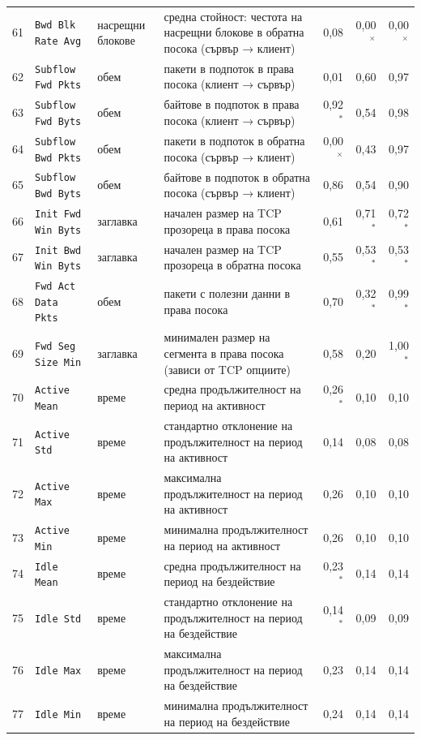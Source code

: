 {{\begin{tabularx}{\textwidth}{@{}rl l Lrrr@{}}
61 & \texttt{Bwd Blk Rate Avg} & насрещни блокове & средна стойност: честота на насрещни блокове в обратна посока (сървър → клиент) & 0,08 & 0,00$^{\times}$ & 0,00$^{\times}$\\
62 & \texttt{Subflow Fwd Pkts} & обем & пакети в подпоток в права посока (клиент → сървър) & 0,01 & 0,60 & 0,97\\
63 & \texttt{Subflow Fwd Byts} & обем & байтове в подпоток в права посока (клиент → сървър) & 0,92$^{\ast}$ & 0,54 & 0,98\\
64 & \texttt{Subflow Bwd Pkts} & обем & пакети в подпоток в обратна посока (сървър → клиент) & 0,00$^{\times}$ & 0,43 & 0,97\\
65 & \texttt{Subflow Bwd Byts} & обем & байтове в подпоток в обратна посока (сървър → клиент) & 0,86 & 0,54 & 0,90\\
66 & \texttt{Init Fwd Win Byts} & заглавка & начален размер на TCP прозореца в права посока & 0,61 & 0,71$^{\ast}$ & 0,72$^{\ast}$\\
67 & \texttt{Init Bwd Win Byts} & заглавка & начален размер на TCP прозореца в обратна посока & 0,55 & 0,53$^{\ast}$ & 0,53$^{\ast}$\\
68 & \texttt{Fwd Act Data Pkts} & обем & пакети с полезни данни в права посока & 0,70 & 0,32$^{\ast}$ & 0,99$^{\ast}$\\
69 & \texttt{Fwd Seg Size Min} & заглавка & минимален размер на сегмента в права посока (зависи от TCP опциите) & 0,58 & 0,20 & 1,00$^{\ast}$\\
70 & \texttt{Active Mean} & време & средна продължителност на период на активност & 0,26$^{\ast}$ & 0,10 & 0,10\\
71 & \texttt{Active Std} & време & стандартно отклонение на продължителност на период на активност & 0,14 & 0,08 & 0,08\\
72 & \texttt{Active Max} & време & максимална продължителност на период на активност & 0,26 & 0,10 & 0,10\\
73 & \texttt{Active Min} & време & минимална продължителност на период на активност & 0,26 & 0,10 & 0,10\\
74 & \texttt{Idle Mean} & време & средна продължителност на период на бездействие & 0,23$^{\ast}$ & 0,14 & 0,14\\
75 & \texttt{Idle Std} & време & стандартно отклонение на продължителност на период на бездействие & 0,14$^{\ast}$ & 0,09 & 0,09\\
76 & \texttt{Idle Max} & време & максимална продължителност на период на бездействие & 0,23 & 0,14 & 0,14\\
77 & \texttt{Idle Min} & време & минимална продължителност на период на бездействие & 0,24 & 0,14 & 0,14\\
\bottomrule
\end{tabularx}}%
\par{}
}
